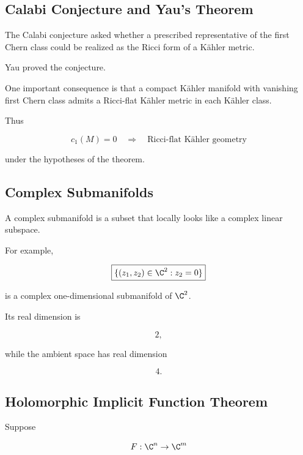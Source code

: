 \subsection{Calabi Conjecture and Yau's Theorem}
\label{subsec:calabi-yau-theorem}

The Calabi conjecture asked whether a prescribed representative of the first
Chern class could be realized as the Ricci form of a K\"ahler metric.

Yau proved the conjecture.

One important consequence is that a compact K\"ahler manifold with vanishing
first Chern class admits a Ricci-flat K\"ahler metric in each K\"ahler class.

Thus

\[
\boxed{
c_1(M)=0
\quad\Longrightarrow\quad
\text{Ricci-flat K\"ahler geometry}
}
\]

under the hypotheses of the theorem.

\subsection{Complex Submanifolds}
\label{subsec:complex-submanifolds}

A complex submanifold is a subset that locally looks like a complex linear
subspace.

For example,

\[
\boxed{
\{(z_1,z_2)\in\C^2:z_2=0\}
}
\]

is a complex one-dimensional submanifold of \(\C^2\).

Its real dimension is

\[
2,
\]

while the ambient space has real dimension

\[
4.
\]

\subsection{Holomorphic Implicit Function Theorem}
\label{subsec:holomorphic-implicit-function}

Suppose

\[
F:\C^n\to\C^m
\]

